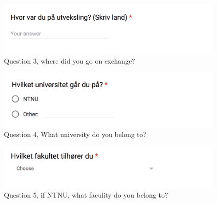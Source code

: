\begin{figure}[h]
    \centering
\includegraphics[width=1\textwidth]{fig/form1/where.png}
    \caption[]{Question 3, where did you go on exchange?}
    \label{fig:q13}
\end{figure}

\begin{figure}[h]
    \centering
\includegraphics[width=1\textwidth]{fig/form1/uni.png}
    \caption[]{Question 4, What university do you belong to?}
    \label{fig:q14}
\end{figure}

\begin{figure}[h]
    \centering
    
\includegraphics[width=1\textwidth]{fig/form1/faculty.png}
    \caption[]{Question 5, if NTNU, what faculity do you belong to?}
    \label{fig:q15}
\end{figure}

